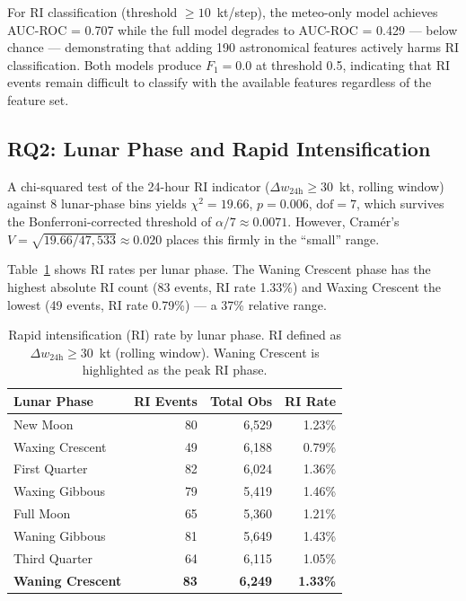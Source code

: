 \documentclass[12pt,a4paper]{article}
\begin{document}
For RI classification (threshold $\geq 10$~kt/step), the meteo-only model
achieves AUC-ROC = 0.707 while the full model degrades to AUC-ROC = 0.429 —
below chance — demonstrating that adding 190 astronomical features actively
harms RI classification.
Both models produce $F_1 = 0.0$ at threshold 0.5, indicating that RI events
remain difficult to classify with the available features regardless of the
feature set.

\subsection{RQ2: Lunar Phase and Rapid Intensification}
\label{sec:h2}

A chi-squared test of the 24-hour RI indicator ($\Delta w_\text{24h} \geq 30$~kt,
rolling window) against 8 lunar-phase bins yields
$\chi^2 = 19.66$, $p = 0.006$, $\mathrm{dof} = 7$,
which survives the Bonferroni-corrected threshold of $\alpha/7 \approx 0.0071$.
However, Cram\'er's $V = \sqrt{19.66/47{,}533} \approx 0.020$ places this firmly
in the ``small'' range.

Table~\ref{tab:ri_lunar} shows RI rates per lunar phase.
The Waning Crescent phase has the highest absolute RI count (83 events, RI rate
1.33\%) and Waxing Crescent the lowest (49 events, RI rate 0.79\%) — a 37\%
relative range.

\begin{table}[H]
  \centering
  \caption{Rapid intensification (RI) rate by lunar phase.
           RI defined as $\Delta w_\text{24h} \geq 30$~kt (rolling window).
           Waning Crescent is highlighted as the peak RI phase.}
  \label{tab:ri_lunar}
  \begin{tabular}{lrrr}
    \toprule
    \textbf{Lunar Phase} & \textbf{RI Events} & \textbf{Total Obs} & \textbf{RI Rate} \\
    \midrule
    New Moon              &  80 & 6{,}529 & 1.23\% \\
    Waxing Crescent       &  49 & 6{,}188 & 0.79\% \\
    First Quarter         &  82 & 6{,}024 & 1.36\% \\
    Waxing Gibbous        &  79 & 5{,}419 & 1.46\% \\
    Full Moon             &  65 & 5{,}360 & 1.21\% \\
    Waning Gibbous        &  81 & 5{,}649 & 1.43\% \\
    Third Quarter         &  64 & 6{,}115 & 1.05\% \\
    \textbf{Waning Crescent} & \textbf{83} & \textbf{6{,}249} & \textbf{1.33\%} \\
    \bottomrule
  \end{tabular}
\end{table}
\end{document}

